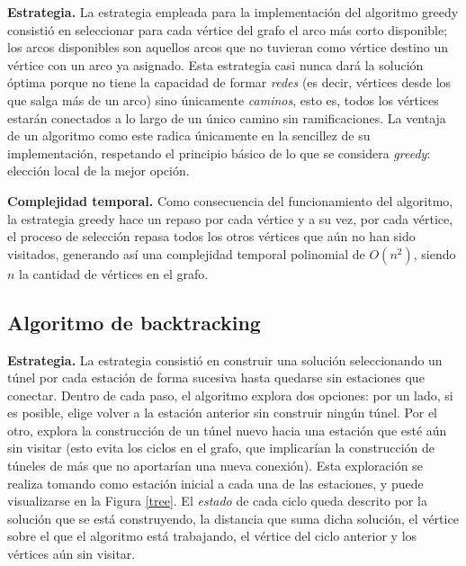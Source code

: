\documentclass[10 pt, A4paper]{article}
\begin{document}
	\textbf{Estrategia.} La estrategia empleada para la implementación del algoritmo greedy consistió en seleccionar para cada vértice del grafo el arco más corto disponible; los arcos disponibles son aquellos arcos que no tuvieran como vértice destino un vértice con un arco ya asignado. Esta estrategia casi nunca dará la solución óptima porque no tiene la capacidad de formar \textit{redes} (es decir, vértices desde los que salga más de un arco) sino únicamente \textit{caminos}, esto es, todos los vértices estarán conectados a lo largo de un único camino sin ramificaciones. La ventaja de un algoritmo como este radica únicamente en la sencillez de su implementación, respetando el principio básico de lo que se considera \textit{greedy}: elección local de la mejor opción.
	
	\textbf{Complejidad temporal.} Como consecuencia del funcionamiento del algoritmo, la estrategia greedy hace un repaso por cada vértice y a su vez, por cada vértice, el proceso de selección repasa todos los otros vértices que aún no han sido visitados, generando así una complejidad temporal polinomial de $O(n^2)$, siendo $n$ la cantidad de vértices en el grafo.
	
	\subsection*{Algoritmo de backtracking}

	\textbf{Estrategia.} La estrategia consistió en construir una solución seleccionando un túnel por cada estación de forma sucesiva hasta quedarse sin estaciones que conectar. Dentro de cada paso, el algoritmo explora dos opciones: por un lado, si es posible, elige volver a la estación anterior sin construir ningún túnel. Por el otro, explora la construcción de un túnel nuevo hacia una estación que esté aún sin visitar (esto evita los ciclos en el grafo, que implicarían la construcción de túneles de más que no aportarían una nueva conexión). Esta exploración se realiza tomando como estación inicial a cada una de las estaciones, y puede visualizarse en la Figura \ref{tree}. El \textit{estado} de cada ciclo queda descrito por la solución que se está construyendo, la distancia que suma dicha solución, el vértice sobre el que el algoritmo está trabajando, el vértice del ciclo anterior y los vértices aún sin visitar.
	
\end{document}
